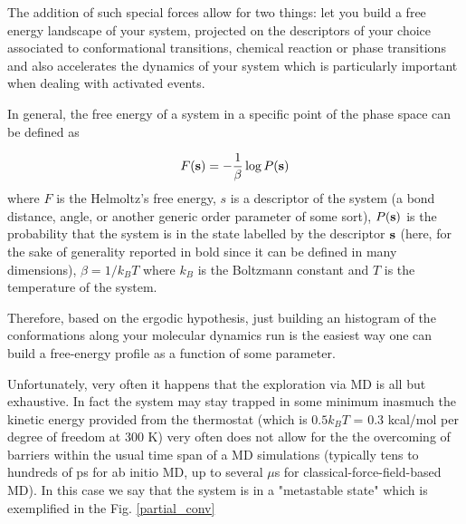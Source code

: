 \documentclass[10pt,fleqn,a4paper]{report}
\begin{document}
The addition of such special forces allow for two things: let you build a free energy landscape of your system, projected on the descriptors of your choice associated to conformational transitions,  chemical reaction or phase transitions and also accelerates the dynamics of your system which is particularly important when dealing with activated events.

In general, the free energy of a system in a specific point of the phase space can be defined as

\begin{equation}
F({\bf s})=-\frac{1}{\beta}\log P({\bf s})
\end{equation}
where $F$ is the Helmoltz's free energy, $s$ is a descriptor of the system (a bond distance, angle, or another generic order parameter of some sort), 
$P({\bf s})$ is the probability that the system is in the state labelled by the descriptor ${\bf s}$ (here, for the sake of generality reported in bold since it can be defined in many dimensions), $\beta=1/k_BT$ where $k_B$ is the Boltzmann constant and $T$ is the temperature of the system.

Therefore, based on the ergodic hypothesis, just building an histogram of the conformations along your molecular dynamics run is the easiest way one can build a free-energy profile as a function of some parameter.

Unfortunately, very often it happens that the exploration via MD is all but exhaustive. In fact the system may stay trapped in some minimum inasmuch the kinetic energy provided from the thermostat (which is $0.5 k_BT$ = 0.3 kcal/mol per degree of freedom at 300 K) very often does not allow for the the overcoming of barriers within the usual time span of a MD simulations (typically tens to hundreds of ps for ab initio MD, up to several $\mu$s for classical-force-field-based MD). In this case we say that the system is in a "metastable state" which is  exemplified in the Fig. \ref{partial_conv}
\end{document}
